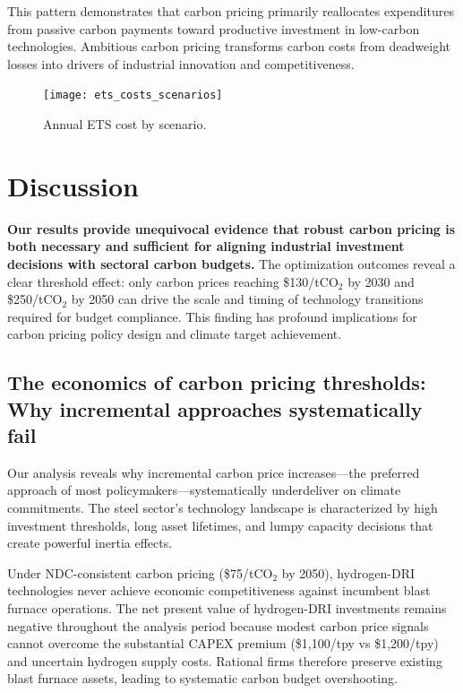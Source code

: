 \documentclass[preprint,1p,authoryear]{elsarticle}
\begin{document}
This pattern demonstrates that carbon pricing primarily reallocates expenditures from passive carbon payments toward productive investment in low-carbon technologies. Ambitious carbon pricing transforms carbon costs from deadweight losses into drivers of industrial innovation and competitiveness.

\begin{figure}[!t]
  \centering
  \texttt{[image: ets\_costs\_scenarios]}
  \caption{Annual ETS cost by scenario.}
  \label{fig:ets-scenarios}
\end{figure}


\section{Discussion}

\textbf{Our results provide unequivocal evidence that robust carbon pricing is both necessary and sufficient for aligning industrial investment decisions with sectoral carbon budgets.} The optimization outcomes reveal a clear threshold effect: only carbon prices reaching \$130/tCO$_2$ by 2030 and \$250/tCO$_2$ by 2050 can drive the scale and timing of technology transitions required for budget compliance. This finding has profound implications for carbon pricing policy design and climate target achievement.

\subsection{The economics of carbon pricing thresholds: Why incremental approaches systematically fail}

Our analysis reveals why incremental carbon price increases—the preferred approach of most policymakers—systematically underdeliver on climate commitments. The steel sector's technology landscape is characterized by high investment thresholds, long asset lifetimes, and lumpy capacity decisions that create powerful inertia effects.

Under NDC-consistent carbon pricing (\$75/tCO$_2$ by 2050), hydrogen-DRI technologies never achieve economic competitiveness against incumbent blast furnace operations. The net present value of hydrogen-DRI investments remains negative throughout the analysis period because modest carbon price signals cannot overcome the substantial CAPEX premium (\$1,100/tpy vs \$1,200/tpy) and uncertain hydrogen supply costs. Rational firms therefore preserve existing blast furnace assets, leading to systematic carbon budget overshooting.
\end{document}
